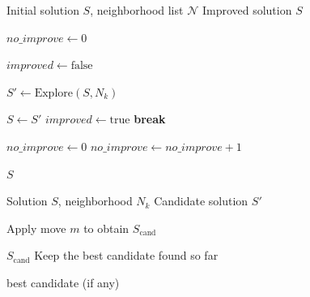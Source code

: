 \documentclass{article}
\begin{document}
\begin{algorithm}[H]
\caption{Basic Variable Neighborhood Descent (BVND)}
\begin{algorithmic}[1]
\Require Initial solution $S$, neighborhood list $\mathcal{N}$
\Ensure Improved solution $S$

\State $no\_improve \gets 0$

    \State $improved \gets \text{false}$

        \State $S' \gets \text{Explore}(S, N_k)$

            \State $S \gets S'$
            \State $improved \gets \text{true}$
            \State \textbf{break} 
        \EndIf
    \EndFor

        \State $no\_improve \gets 0$
    \Else
        \State $no\_improve \gets no\_improve + 1$
    \EndIf
\EndWhile

\State \Return $S$
\end{algorithmic}
\end{algorithm}

\begin{algorithm}[H]
\caption{Neighborhood Exploration}
\begin{algorithmic}[1]
\Require Solution $S$, neighborhood $N_k$
\Ensure Candidate solution $S'$

    \State Apply move $m$ to obtain $S_{\text{cand}}$

            \State \Return $S_{\text{cand}}$
        \EndIf
    \Else
        \State Keep the best candidate found so far
    \EndIf
\EndFor

\State \Return best candidate (if any)
\end{algorithmic}
\end{algorithm}
\end{document}
